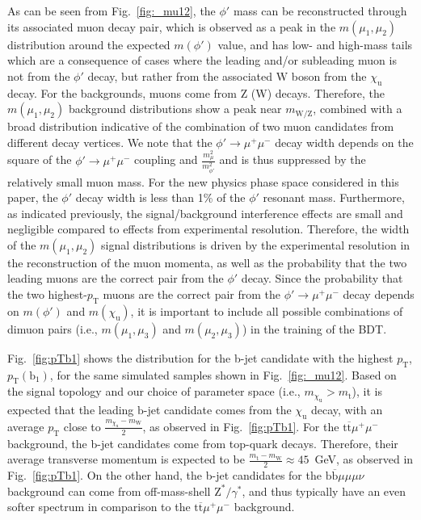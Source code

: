 As can be seen from Fig.~\ref{fig:_mu12}, the $\phi'$ mass can be reconstructed through its associated muon decay pair, which is observed as a peak in the $m(\mu_{1}, \mu_{2})$ distribution around the expected $m(\phi')$ value, and has low- and high-mass tails which are a consequence of cases where the leading and/or subleading muon is not from the $\phi'$ decay, but rather from the associated $\mathrm{W}$ boson from the $\chi_{\mathrm{u}}$ decay. For the backgrounds, muons come from \textrm{Z} (\textrm{W}) decays. Therefore, the $m(\mu_{1}, \mu_{2})$ background distributions show a peak near $m_{\mathrm{W/Z}}$, combined with a broad distribution indicative of the combination of two muon candidates from different decay vertices. We note that the $\phi'\to\mu^{+}\mu^{-}$ decay width depends on the square of the $\phi'\to\mu^{+}\mu^{-}$ coupling and  $\frac{m_{\mu}^{2}}{m_{\phi'}^{2}}$ and is thus suppressed by the relatively small muon mass. For the new physics phase space considered in this paper, the $\phi'$ decay width is less than 1\% of the $\phi'$ resonant mass. Furthermore, as indicated previously, the signal/background interference effects are small and negligible compared to effects from experimental resolution. Therefore, the width of the $m(\mu_{1}, \mu_{2})$ signal distributions is driven by the experimental resolution in the reconstruction of the muon momenta, as well as the probability that the two leading muons are the correct pair from the $\phi'$ decay. Since the probability that the two highest-$p_{\mathrm{T}}$ muons are the correct pair from the $\phi'\to\mu^{+}\mu^{-}$ decay depends on $m(\phi')$ and $m(\chi_\mathrm{u})$, it is important to include all possible combinations of dimuon pairs (i.e., $m(\mu_{1}, \mu_{3})$ and $m(\mu_{2}, \mu_{3})$) in the training of the BDT. 

Fig.~\ref{fig:pTb1} shows the  distribution for the \textrm{b}-jet candidate with the highest $p_{\mathrm{T}}$, $p_{\mathrm{T}}(\mathrm{b}_1)$, for the same simulated samples shown in Fig.~\ref{fig:_mu12}. Based on the signal topology and our choice of parameter space (i.e., $m_{\chi_\mathrm{u}} > m_{\mathrm{t}}$), it is expected that the leading $\mathrm{b}$-jet candidate comes from the $\chi_\mathrm{u}$ decay, with an average $p_{\mathrm{T}}$ close to $\frac{m_{\chi_\mathrm{u}} - m_{\mathrm{W}}}{2}$, as observed in Fig.~\ref{fig:pTb1}. For the $\mathrm{t} \overline{\mathrm{t}} \mu^{+}\mu^{-}$ background, the \textrm{b}-jet candidates come from top-quark decays. Therefore, their average transverse momentum is expected to be $\frac{m_{\mathrm{t}} - m_{\mathrm{W}}}{2} \approx 45$~\textrm{GeV}, as observed in Fig.~\ref{fig:pTb1}. On the other hand, the \textrm{b}-jet candidates for the $\mathrm{b} \overline{\mathrm{b}}\mu\mu\mu\nu$ background can come from off-mass-shell $\mathrm{Z}^{*}/\gamma^{*}$, and thus typically have an even softer spectrum in comparison to the $\mathrm{t} \overline{\mathrm{t}} \mu^{+}\mu^{-}$ background.


